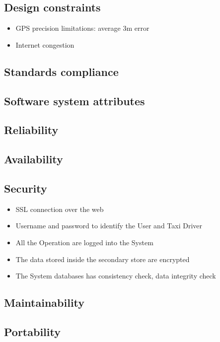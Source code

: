 \documentclass[english]{article}
\begin{document}
\subsection{Design constraints}
	\begin{itemize}
		\item GPS precision limitations: average 3m error
		\item Internet congestion
	\end{itemize}

\subsection{Standards compliance}

\subsection{Software system attributes}

\subsection{Reliability}

\subsection{Availability}

\subsection{Security}
	\begin{itemize}
		\item SSL connection over the web
		\item Username and password to identify the User and Taxi Driver
		\item All the Operation are logged into the System
		\item The data stored inside the secondary store are encrypted
		\item The System databases has consistency check, data integrity check
	\end{itemize}

\subsection{Maintainability}

\subsection{Portability}
\end{document}
